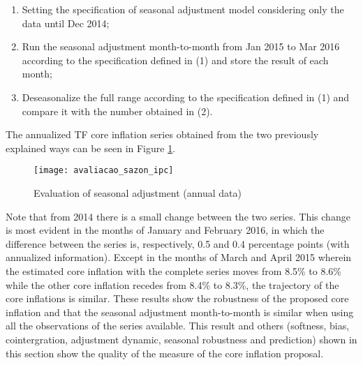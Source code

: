 \documentclass[10pt]{article}
\begin{document}
\begin{enumerate}
\setlength\itemsep{0.1em}

\item{Setting the specification of seasonal adjustment model considering only the data until Dec 2014;}
\item{Run the seasonal adjustment month-to-month from Jan 2015 to Mar 2016 according to the specification defined in (1) and store the result of each month;}
\item{Deseasonalize the full range according to the specification defined in (1) and compare it with the number obtained in (2).}
\end{enumerate}

The annualized TF core inflation series obtained from the two previously explained ways can be seen in Figure \ref{avaliacao_sazon}. 


\begin{figure}[]
  \centering
  \texttt{[image: avaliacao\_sazon\_ipc]}
  \caption{Evaluation of seasonal adjustment (annual data)}
  \label{avaliacao_sazon}
\end{figure}

Note that from 2014 there is a small change between the two series. This change is most evident in the months of January and February 2016, in which the difference between the series is, respectively, 0.5 and 0.4 percentage points (with annualized information). Except in the months of March and April 2015  wherein the estimated core inflation with the complete series moves from 8.5\% to 8.6\% while the other core inflation recedes from 8.4\% to 8.3\%, the trajectory of the core inflations is similar. These results show the robustness of the proposed core inflation and that the seasonal adjustment month-to-month is similar when using all the observations of the series available. This result and others (softness, bias, cointergration, adjustment dynamic, seasonal robustness and prediction) shown in this section show the quality of the measure of the core inflation proposal.
\end{document}
